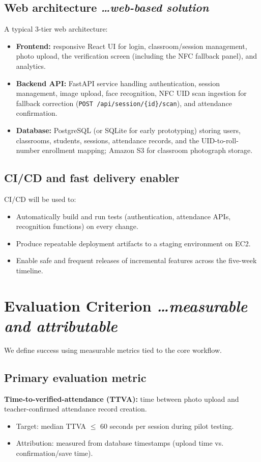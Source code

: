 \documentclass[11pt,a4paper]{article}
\newcommand{\BvrHint}[1]{%
  {\normalfont\normalsize\itshape\hfill #1}}
\begin{document}
\subsection{Web architecture %
\BvrHint{\ldots web-based solution}}
A typical 3-tier web architecture:
\begin{itemize}[leftmargin=0.7cm]
    \item \textbf{Frontend:} responsive React UI for login, classroom/session management, photo upload, the verification screen (including the NFC fallback panel), and analytics.
    \item \textbf{Backend API:} FastAPI service handling authentication, session management, image upload, face recognition, NFC UID scan ingestion for fallback correction (\texttt{POST /api/session/\{id\}/scan}), and attendance confirmation.
    \item \textbf{Database:} PostgreSQL (or SQLite for early prototyping) storing users, classrooms, students, sessions, attendance records, and the UID-to-roll-number enrollment mapping; Amazon S3 for classroom photograph storage.
\end{itemize}

\subsection{CI/CD and fast delivery enabler}
CI/CD will be used to:
\begin{itemize}[leftmargin=0.7cm]
    \item Automatically build and run tests (authentication, attendance APIs, recognition functions) on every change.
    \item Produce repeatable deployment artifacts to a staging environment on EC2.
    \item Enable safe and frequent releases of incremental features across the five-week timeline.
\end{itemize}

\section{Evaluation Criterion %
\BvrHint{\ldots measurable and attributable}}
We define success using measurable metrics tied to the core
workflow.

\subsection{Primary evaluation metric}
\textbf{Time-to-verified-attendance (TTVA):} time between photo
upload and teacher-confirmed attendance record creation.
\begin{itemize}[leftmargin=0.7cm]
    \item Target: median TTVA $\le$ 60 seconds per session during pilot testing.
    \item Attribution: measured from database timestamps (upload time vs. confirmation/save time).
\end{itemize}
\end{document}
